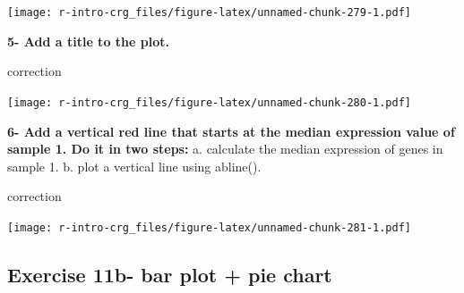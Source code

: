 \documentclass[]{book}
\newenvironment{Shaded}{\begin{snugshade}}{\end{snugshade}}
\newcommand{\CommentTok}[1]{\textcolor[rgb]{0.56,0.35,0.01}{\textit{#1}}}
\newcommand{\DataTypeTok}[1]{\textcolor[rgb]{0.13,0.29,0.53}{#1}}
\newcommand{\DecValTok}[1]{\textcolor[rgb]{0.00,0.00,0.81}{#1}}
\newcommand{\KeywordTok}[1]{\textcolor[rgb]{0.13,0.29,0.53}{\textbf{#1}}}
\newcommand{\NormalTok}[1]{#1}
\newcommand{\OperatorTok}[1]{\textcolor[rgb]{0.81,0.36,0.00}{\textbf{#1}}}
\newcommand{\StringTok}[1]{\textcolor[rgb]{0.31,0.60,0.02}{#1}}
\begin{document}
\texttt{[image: r-intro-crg\_files/figure-latex/unnamed-chunk-279-1.pdf]}

\textbf{5- Add a title to the plot.}

correction

\begin{Shaded}
\end{Shaded}

\texttt{[image: r-intro-crg\_files/figure-latex/unnamed-chunk-280-1.pdf]}

\textbf{6- Add a vertical red line that starts at the median expression value of sample 1. Do it in two steps:}
a. calculate the median expression of genes in sample 1.
b. plot a vertical line using abline().

correction

\begin{Shaded}
\end{Shaded}

\texttt{[image: r-intro-crg\_files/figure-latex/unnamed-chunk-281-1.pdf]}

\hypertarget{exercise-11b--bar-plot-pie-chart}{%
\subsection{Exercise 11b- bar plot + pie chart}\label{exercise-11b--bar-plot-pie-chart}}
\end{document}
